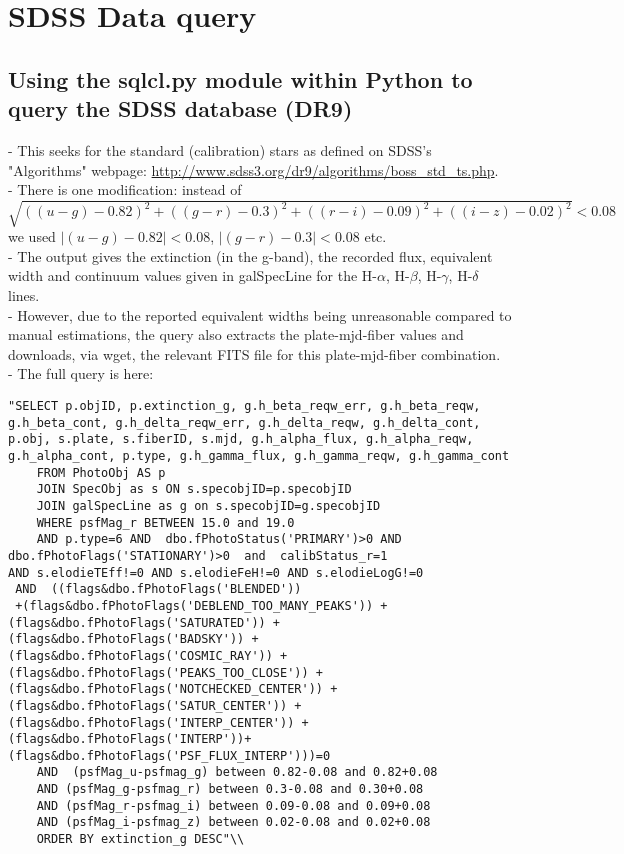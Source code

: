 \documentclass[12pt]{article}
\begin{document}
\section{SDSS Data query}
\subsection{ Using the sqlcl.py module within Python to query the SDSS database (DR9)}
- This seeks for the standard (calibration) stars as defined on SDSS's "Algorithms" webpage: \url{http://www.sdss3.org/dr9/algorithms/boss_std_ts.php}. \\
- There is one modification: instead of \\ $\sqrt{((u-g)-0.82)^2+((g-r)-0.3)^2+((r-i)-0.09)^2+((i-z)-0.02)^2}<0.08$ we used $|(u-g)-0.82|<0.08$, $|(g-r)-0.3|<0.08$ etc. \\
- The output gives the extinction (in the g-band), the recorded flux, equivalent width and continuum values given in galSpecLine for the H-$\alpha$, H-$\beta$, H-$\gamma$, H-$\delta$ lines. \\
- However, due to the reported equivalent widths being unreasonable compared to manual estimations, the query also extracts the plate-mjd-fiber values and downloads, via wget, the relevant FITS file for this plate-mjd-fiber combination. \\
- The full query is here: 
\begin{verbatim}"SELECT p.objID, p.extinction_g, g.h_beta_reqw_err, g.h_beta_reqw, 
g.h_beta_cont, g.h_delta_reqw_err, g.h_delta_reqw, g.h_delta_cont, 
p.obj, s.plate, s.fiberID, s.mjd, g.h_alpha_flux, g.h_alpha_reqw, 
g.h_alpha_cont, p.type, g.h_gamma_flux, g.h_gamma_reqw, g.h_gamma_cont 
    FROM PhotoObj AS p 
    JOIN SpecObj as s ON s.specobjID=p.specobjID 
    JOIN galSpecLine as g on s.specobjID=g.specobjID 
    WHERE psfMag_r BETWEEN 15.0 and 19.0 
    AND p.type=6 AND  dbo.fPhotoStatus('PRIMARY')>0 AND 
dbo.fPhotoFlags('STATIONARY')>0  and  calibStatus_r=1 
AND s.elodieTEff!=0 AND s.elodieFeH!=0 AND s.elodieLogG!=0 
 AND  ((flags&dbo.fPhotoFlags('BLENDED')) 
 +(flags&dbo.fPhotoFlags('DEBLEND_TOO_MANY_PEAKS')) +   
(flags&dbo.fPhotoFlags('SATURATED')) +
(flags&dbo.fPhotoFlags('BADSKY')) + 
(flags&dbo.fPhotoFlags('COSMIC_RAY')) +
(flags&dbo.fPhotoFlags('PEAKS_TOO_CLOSE')) +   
(flags&dbo.fPhotoFlags('NOTCHECKED_CENTER')) +
(flags&dbo.fPhotoFlags('SATUR_CENTER')) +  
(flags&dbo.fPhotoFlags('INTERP_CENTER')) +
(flags&dbo.fPhotoFlags('INTERP'))+  
(flags&dbo.fPhotoFlags('PSF_FLUX_INTERP')))=0 
    AND  (psfMag_u-psfmag_g) between 0.82-0.08 and 0.82+0.08 
    AND (psfMag_g-psfmag_r) between 0.3-0.08 and 0.30+0.08 
    AND (psfMag_r-psfmag_i) between 0.09-0.08 and 0.09+0.08 
    AND (psfMag_i-psfmag_z) between 0.02-0.08 and 0.02+0.08 
    ORDER BY extinction_g DESC"\\
\end{verbatim}
\end{document}
